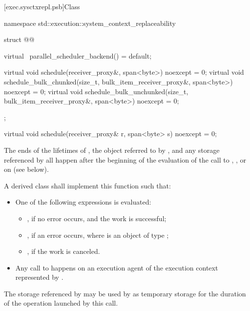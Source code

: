 [exec.sysctxrepl.psb]{Class }

\begin{codeblock}
namespace std::execution::system_context_replaceability {
  struct @@ {
    virtual ~parallel_scheduler_backend() = default;

    virtual void schedule(receiver_proxy&, span<byte>) noexcept = 0;
    virtual void schedule_bulk_chunked(size_t, bulk_item_receiver_proxy&,
                                       span<byte>) noexcept = 0;
    virtual void schedule_bulk_unchunked(size_t, bulk_item_receiver_proxy&,
                                         span<byte>) noexcept = 0;
  };
}
\end{codeblock}

%
\begin{itemdecl}
virtual void schedule(receiver_proxy& r, span<byte> s) noexcept = 0;
\end{itemdecl}

\begin{itemdescr}
\pnum
\expects
The ends of
the lifetimes of ,
the object referred to by , and
any storage referenced by 
all happen after
the beginning of the evaluation of
the call to , , or 
on  (see below).

\pnum
\effects
A derived class shall implement this function such that:
\begin{itemize}
\item
One of the following expressions is evaluated:
\begin{itemize}
\item
{}, if no error occurs, and the work is successful;
\item
{}, if an error occurs,
where  is an object of type ;
\item
{}, if the work is canceled.
\end{itemize}
\item
Any call to  happens on
an execution agent of the execution context represented by .
\end{itemize}

\pnum
\remarks
The storage referenced by 
may be used by  as temporary storage
for the duration of the operation launched by this call.
\end{itemdescr}


